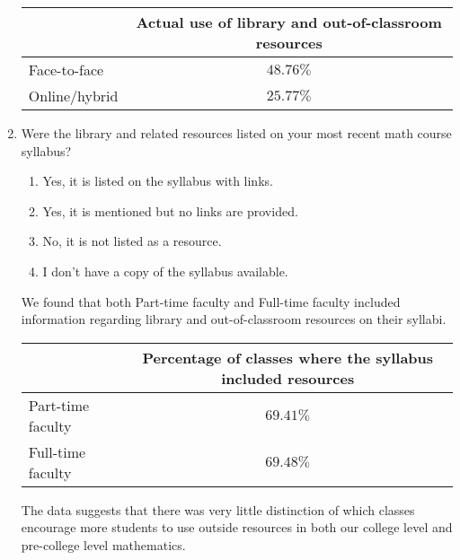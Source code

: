 \begin{enumerate}
	\begin{tabular}{lc}
		\toprule
		              & Actual use of library and out-of-classroom resources \\
		\midrule
		Face-to-face  & $48.76\%$                                            \\
		Online/hybrid & $25.77\%$                                            \\
		\bottomrule
	\end{tabular}
	\item Were the library and related resources listed on your most recent math course syllabus?
	\begin{enumerate}
		\item Yes, it is listed on the syllabus with links.
		\item Yes, it is mentioned but no links are provided.
		\item No, it is not listed as a resource.
		\item I don't have a copy of the syllabus available.
	\end{enumerate}
	We found that both Part-time faculty and Full-time faculty included information regarding library and out-of-classroom resources on their syllabi.
	
	\begin{tabular}{lc}
		\toprule
		                  & Percentage of classes where the syllabus included resources \\
		\midrule
		Part-time faculty & $69.41\%$                                                   \\
		Full-time faculty & $69.48\%$                                                   \\
		\bottomrule
	\end{tabular}
	
	The data suggests that there was very little distinction of which classes encourage more students to use outside resources in both our college level and pre-college level mathematics. 
	

\end{enumerate}
